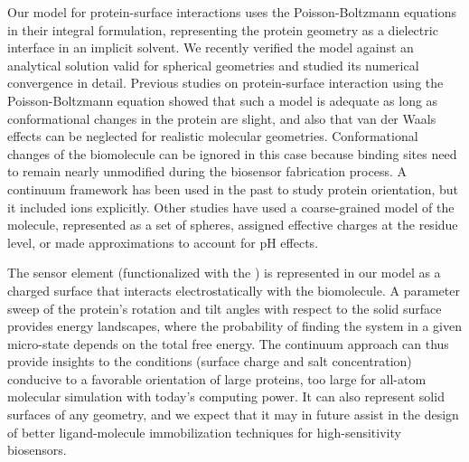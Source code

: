 Our model for protein-surface interactions uses the Poisson-Boltzmann equations in their integral formulation, representing the protein geometry as a dielectric interface in an implicit solvent. We recently verified the model against an analytical solution valid for spherical geometries and studied its numerical convergence in detail.\cite{CooperBarba2015a}
Previous studies on protein-surface interaction using the Poisson-Boltzmann equation showed that such a model is adequate as long as conformational changes in the protein are slight,\cite{YaoLenhoff2004,YaoLenhoff2005} and also that van der Waals effects can be neglected for realistic molecular geometries.\cite{RothNealLenhoff1996}
Conformational changes of the biomolecule can be ignored in this case because binding sites need to remain nearly unmodified during the biosensor fabrication process.\cite{TajimaTakaiIshihara2011} 
A continuum framework has been used in the past to study protein orientation,\cite{JufferArgosDevlieg1996} but it included ions explicitly. Other studies have used a coarse-grained model of the molecule, represented as  a set of spheres,\cite{ShengTsaoZhouJiang2002,ZhouTsaoShengJiang2004} assigned effective charges at the residue level,\cite{FreedCramer2011,ZhouChenJiang2003} or made approximations to account for pH effects.\cite{BiesheuvelvanderVeenNord2005,HartvigdeWeertOstergaartJorgensenJensen2011}

The sensor element (functionalized with the \sam) is represented in our model as a charged surface that interacts electrostatically with the biomolecule. A parameter sweep of the protein's rotation and tilt angles with respect to the solid surface provides energy landscapes, where the probability of finding the system in a given micro-state depends on the total free energy.
The continuum approach can thus provide insights to the conditions (surface charge and salt concentration) conducive to a favorable orientation of large proteins, too large for all-atom molecular simulation with today's computing power. It can also represent solid surfaces of any geometry, and we expect that it may in future assist in the design of better ligand-molecule immobilization techniques for high-sensitivity biosensors.

